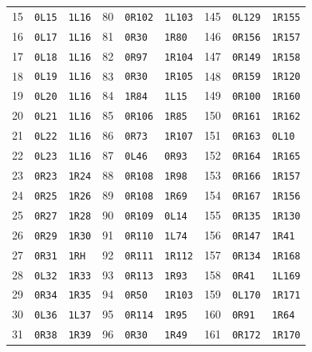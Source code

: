 \begin{longtable}{@{}rll@{\hspace{20pt}}rll@{\hspace{20pt}}rll@{}}
15 & \texttt{0L15} & \texttt{1L16} & 80 & \texttt{0R102} & \texttt{1L103} & 145 & \texttt{0L129} & \texttt{1R155}\\
16 & \texttt{0L17} & \texttt{1L16} & 81 & \texttt{0R30} & \texttt{1R80} & 146 & \texttt{0R156} & \texttt{1R157}\\
17 & \texttt{0L18} & \texttt{1L16} & 82 & \texttt{0R97} & \texttt{1R104} & 147 & \texttt{0R149} & \texttt{1R158}\\
18 & \texttt{0L19} & \texttt{1L16} & 83 & \texttt{0R30} & \texttt{1R105} & 148 & \texttt{0R159} & \texttt{1R120}\\
19 & \texttt{0L20} & \texttt{1L16} & 84 & \texttt{1R84} & \texttt{1L15} & 149 & \texttt{0R100} & \texttt{1R160}\\
20 & \texttt{0L21} & \texttt{1L16} & 85 & \texttt{0R106} & \texttt{1R85} & 150 & \texttt{0R161} & \texttt{1R162}\\
21 & \texttt{0L22} & \texttt{1L16} & 86 & \texttt{0R73} & \texttt{1R107} & 151 & \texttt{0R163} & \texttt{0L10}\\
22 & \texttt{0L23} & \texttt{1L16} & 87 & \texttt{0L46} & \texttt{0R93} & 152 & \texttt{0R164} & \texttt{1R165}\\
23 & \texttt{0R23} & \texttt{1R24} & 88 & \texttt{0R108} & \texttt{1R98} & 153 & \texttt{0R166} & \texttt{1R157}\\
24 & \texttt{0R25} & \texttt{1R26} & 89 & \texttt{0R108} & \texttt{1R69} & 154 & \texttt{0R167} & \texttt{1R156}\\
25 & \texttt{0R27} & \texttt{1R28} & 90 & \texttt{0R109} & \texttt{0L14} & 155 & \texttt{0R135} & \texttt{1R130}\\
26 & \texttt{0R29} & \texttt{1R30} & 91 & \texttt{0R110} & \texttt{1L74} & 156 & \texttt{0R147} & \texttt{1R41}\\
27 & \texttt{0R31} & \texttt{1RH} & 92 & \texttt{0R111} & \texttt{1R112} & 157 & \texttt{0R134} & \texttt{1R168}\\
28 & \texttt{0L32} & \texttt{1R33} & 93 & \texttt{0R113} & \texttt{1R93} & 158 & \texttt{0R41} & \texttt{1L169}\\
29 & \texttt{0R34} & \texttt{1R35} & 94 & \texttt{0R50} & \texttt{1R103} & 159 & \texttt{0L170} & \texttt{1R171}\\
30 & \texttt{0L36} & \texttt{1L37} & 95 & \texttt{0R114} & \texttt{1R95} & 160 & \texttt{0R91} & \texttt{1R64}\\
31 & \texttt{0R38} & \texttt{1R39} & 96 & \texttt{0R30} & \texttt{1R49} & 161 & \texttt{0R172} & \texttt{1R170}\\

\end{longtable}
